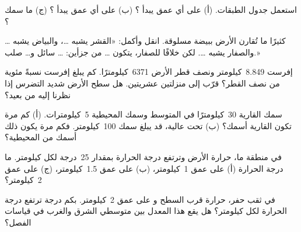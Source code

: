 \begin{exercise}[$\star$]\label{exo:g6:inside-the-earth:3}
استعمل جدول الطبقات. (أ) على أي عمق يبدأ ؟
(ب) على أي عمق يبدأ ؟ (ج) ما سمك ؟
\end{exercise}

\begin{exercise}[$\star$]\label{exo:g6:inside-the-earth:4}
كثيرًا ما تُقارن الأرض ببيضة مسلوقة. انقل وأكمل: «القشر
يشبه \ldots، والبياض يشبه \ldots{} والصفار يشبه
\ldots{}. لكن خلافًا للصفار، يتكون \ldots{} من جزأين: \ldots{}
سائل و\ldots{} صلب.»
\end{exercise}

\begin{exercise}[$\star\star$]\label{exo:g6:inside-the-earth:5}
  إفرست 8.849~كيلومتر ونصف قطر الأرض 6371~كيلومترًا. كم
يبلغ  إفرست نسبةً مئوية من نصف القطر؟ قرّب إلى منزلتين عشريتين.
هل سطح الأرض شديد التضرس إذا نظرنا إليه من بعيد؟
\end{exercise}

\begin{exercise}[$\star\star$]\label{exo:g6:inside-the-earth:6}
سمك  القارية 30~كيلومترًا في المتوسط وسمك  المحيطية
5~كيلومترات. (أ) كم مرة تكون  القارية أسمك؟ (ب) تحت 
عالية، قد يبلغ سمك  100~كيلومتر. فكم مرة يكون ذلك أسمك من
 المحيطية؟
\end{exercise}

\begin{exercise}[$\star\star$]\label{exo:g6:inside-the-earth:7}
في منطقة ما، حرارة الأرض  وترتفع درجة الحرارة بمقدار
25~درجة لكل كيلومتر. ما درجة الحرارة (أ) على عمق 1~كيلومتر، (ب) على عمق
1.5~كيلومتر، (ج) على عمق 2~كيلومتر؟
\end{exercise}

\begin{exercise}[$\star\star$]\label{exo:g6:inside-the-earth:8}
في ثقب حفر، حرارة   قرب السطح
و على عمق 2~كيلومتر. بكم درجة ترتفع درجة الحرارة
لكل كيلومتر؟ هل يقع هذا المعدل بين متوسطي الشرق
والغرب في قياسات الفصل؟
\end{exercise}

